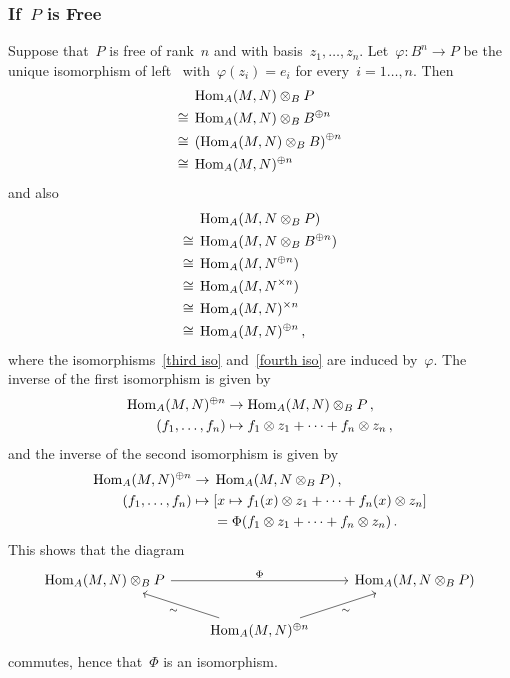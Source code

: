 \subsubsection{If~$P$ is Free}

Suppose that~$P$ is free of rank~$n$ and with basis~$z_1, \dotsc, z_n$.
Let~$\varphi \colon B^n \to P$ be the unique isomorphism of left~{} with~$\varphi(z_i) = e_i$ for every~$i = 1 \dotsc, n$.
Then
\begin{align}
       {}&  \operatorname{Hom}_A(M, N) \otimes_B P  \notag  \\
  \cong{}&  \operatorname{Hom}_A(M, N) \otimes_B B^{\oplus n} \label{third iso} \\
  \cong{}&  \left( \operatorname{Hom}_A(M, N) \otimes_B B \right)^{\oplus n}  \notag  \\
  \cong{}&  \operatorname{Hom}_A(M, N)^{\oplus n} \notag
\end{align}
and also
\begin{align}
       {}&  \operatorname{Hom}_A(M, N \otimes_B P)  \notag  \\
  \cong{}&  \operatorname{Hom}_A(M, N \otimes_B B^{\oplus n}) \label{fourth iso}  \\
  \cong{}&  \operatorname{Hom}_A(M, N^{\oplus n}) \notag  \\
  \cong{}&  \operatorname{Hom}_A(M, N^{\times n}) \notag  \\
  \cong{}&  \operatorname{Hom}_A(M, N)^{\times n}  \notag  \\
  \cong{}&  \operatorname{Hom}_A(M, N)^{\oplus n} \notag  \,,
\end{align}
where the isomorphisms~\eqref{third iso} and~\eqref{fourth iso} are induced by~$\varphi$.
The inverse of the first isomorphism is given by
\begin{align*}
            \operatorname{Hom}_A(M,N)^{\oplus n}
  &\to      \operatorname{Hom}_A(M,N) \otimes_B P \,,
  \\
            (f_1, \dotsc, f_n)
  &\mapsto  f_1 \otimes z_1 + \dotsb + f_n \otimes z_n \,,
\end{align*}
and the inverse of the second isomorphism is given by
\begin{align*}
              \operatorname{Hom}_A(M,N)^{\oplus n}
  \to{}&      \operatorname{Hom}_A(M, N \otimes_B P) \,,
  \\
              (f_1, \dotsc, f_n)
  \mapsto{}&  [x \mapsto f_1(x) \otimes z_1 + \dotsb + f_n(x) \otimes z_n]
  \\
              {}
  &=          \Phi( f_1 \otimes z_1 + \dotsb + f_n \otimes z_n ) \,.
\end{align*}
This shows that the diagram
\[
  \begin{tikzcd}
      \Hom_A(M, N) \tensor_B P
      \arrow{rr}[above]{\Phi}
    & {}
    & \Hom_A(M, N \tensor_B P)
    \\
      {}
    & \Hom_A(M, N)^{\oplus n}
      \arrow{ul}[below left]{\sim}
      \arrow{ur}[below right]{\sim}
    & {}
  \end{tikzcd}
\]
commutes, hence that~$\Phi$ is an isomorphism.




